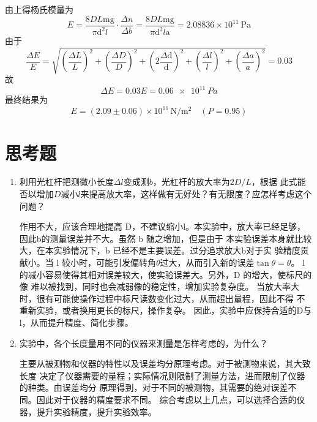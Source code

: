 \documentclass{article}
\begin{document}
由上得杨氏模量为
$$
    E=\frac{8 D L \mathrm{mg}}{\pi \mathrm{d}^2 l} \cdot \frac{\Delta n}{\Delta b}=\frac{8 D L \mathrm{mg}}{\pi \mathrm{d}^2 l \mathrm{a}}=2.08836 \times 10^{11} \mathrm{~Pa}
$$
由于
$$
    \frac{\Delta E}{E}=\sqrt{\left(\frac{\Delta L}{L}\right)^2+\left(\frac{\Delta D}{D}\right)^2+\left(2 \frac{\Delta \mathrm{d}}{\mathrm{d}}\right)^2+\left(\frac{\Delta l}{l}\right)^2+\left(\frac{\Delta a}{a}\right)^2}=0.03
$$
故
\[\Delta E= 0.03E=\SI{0.06e11}{Pa}\]
最终结果为
$$
    E=\left(2.09 \pm 0.06\right) \times 10^{11}\,\mathrm{N/m^2}\quad (P=0.95)
$$



\section*{思考题}

\begin{enumerate}
    \item 利用光杠杆把测微小长度$\Delta l$变成测$ b$，光杠杆的放大率为$ 2D/L$，根据
          此式能否以增加$D$减小$l$来提高放大率，这样做有无好处？有无限度？应怎样考虑这个问题？

          作用不大，应该合理地提高 D，不建议缩小l。本实验中，放大率已经足够，因此b的测量误差并不大。虽然 b 随之增加，但是由于
          本实验误差本身就比较大，在本实验情况下，b 已经不是主要误差。过分追求放大b对于实
          验精度贡献小。当 l 较小时，可能引发偏转角$\theta$过大，从而引入新的误差$\tan \theta =\theta$。
          l 的减小容易使得其相对误差较大，使实验误差大。另外，D 的增大，使标尺的像
          难以被找到，同时也会减弱像的稳定性，增加实验复杂度。
          当放大率大时，很有可能使操作过程中标尺读数变化过大，从而超出量程，因此不得
          不重新实验，或者换用更长的标尺，操作复杂。
          因此，实验中应保持合适的D与l，从而提升精度、简化步骤。

    \item 实验中，各个长度量用不同的仪器来测量是怎样考虑的，为什么？

          主要从被测物和仪器的特性以及误差均分原理考虑。对于被测物来说，其大致长度
          决定了仪器需要的量程；实际情况则限制了测量方法，进而限制了仪器的种类。由误差均分
          原理得到，对于不同的被测物，其需要的绝对误差不同。因此对于仪器的精度要求不同。
          综合考虑以上几点，可以选择合适的仪器，提升实验精度，提升实验效率。
\end{enumerate}
\end{document}
